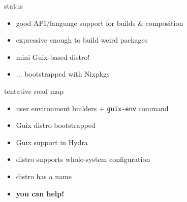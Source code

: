 \documentclass{beamer}
\begin{document}
\begin{frame}{status}
  \begin{itemize}
  \item good API/language support for builds \& composition
  \item expressive enough to build weird packages
  \item<2-> mini Guix-based distro!
  \item<2-> ... bootstrapped with Nixpkgs
  \end{itemize}
\end{frame}

\begin{frame}{tentative road map}
  \begin{itemize}
  \item user environment builders + \texttt{guix-env} command
  \item Guix distro bootstrapped
  \item Guix support in Hydra
  \item distro supports whole-system configuration
  \item<2-> distro has a name
  \item<3-> \bf{you can help!}
  \end{itemize}
\end{frame}




\end{document}
